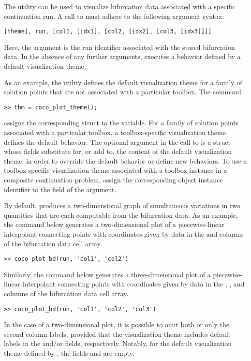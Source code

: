 The utility  can be used to visualize bifurcation data associated with a specific continuation run. A call to  must adhere to the following argument syntax:
 \begin{lstlisting}[language=coco-highlight]
[theme], run, [col1, [idx1], [col2, [idx2], [col3, [idx3]]]]
\end{lstlisting}
Here, the  argument is the run identifier associated with the stored bifurcation data. In the absence of any further arguments,  executes a behavior defined by a default visualization theme. 

As an example, the  utility defines the default visualization theme for a family of solution points that are not associated with a particular toolbox. The command
\begin{lstlisting}[language=coco-highlight]
>> thm = coco_plot_theme();
\end{lstlisting}
assigns the corresponding struct to the  variable. For a family of solution points associated with a particular toolbox, a toolbox-specific visualization theme defines the default behavior. The optional argument  in the call to  is a struct whose fields substitute for, or add to, the content of the default visualization theme, in order to override the default behavior or define new behaviors. To use a toolbox-specific visualization theme associated with a toolbox instance in a composite continuation problem, assign the corresponding object instance identifier to the  field of the  argument.

By default,  produces a two-dimensional graph of simultaneous variations in two quantities that are each computable from the bifurcation data. As an example, the command below generates a two-dimensional plot of a piecewise-linear interpolant connecting points with coordinates given by data in the  and  columns of the bifurcation data cell array.
\begin{lstlisting}[language=coco-highlight]
>> coco_plot_bd(run, 'col1', 'col2')
\end{lstlisting}
Similarly, the command below generates a three-dimensional plot of a piecewise-linear interpolant connecting points with coordinates given by data in the ,  , and  columns of the bifurcation data cell array.
\begin{lstlisting}[language=coco-highlight]
>> coco_plot_bd(run, 'col1', 'col2', 'col3')
\end{lstlisting}
In the case of a two-dimensional plot, it is possible to omit both or only the second column labels, provided that the visualization theme includes default labels in the  and/or  fields, respectively. Notably, for the default visualization theme defined by , the fields  and  are empty.

